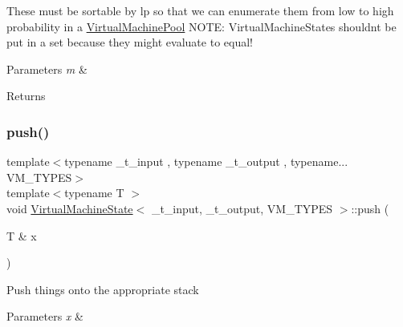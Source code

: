 These must be sortable by lp so that we can enumerate them from low to high probability in a \hyperlink{class_virtual_machine_pool}{Virtual\+Machine\+Pool} N\+O\+TE\+: Virtual\+Machine\+States shouldn\textquotesingle{}t be put in a set because they might evaluate to equal! 


\begin{DoxyParams}{Parameters}
{\em m} & \\
\hline
\end{DoxyParams}
\begin{DoxyReturn}{Returns}

\end{DoxyReturn}
\mbox{\label{class_virtual_machine_state_a7284f92013c7258d2d18ba238441c1a6}} 
\subsubsection{\texorpdfstring{push()}{push()}\hspace{0.1cm}{\footnotesize\ttfamily [1/2]}}
{\footnotesize\ttfamily template$<$typename \+\_\+t\+\_\+input , typename \+\_\+t\+\_\+output , typename... V\+M\+\_\+\+T\+Y\+P\+ES$>$ \\
template$<$typename T $>$ \\
void \hyperlink{class_virtual_machine_state}{Virtual\+Machine\+State}$<$ \+\_\+t\+\_\+input, \+\_\+t\+\_\+output, V\+M\+\_\+\+T\+Y\+P\+ES $>$\+::push (\begin{DoxyParamCaption}\item[{T \&}]{x }\end{DoxyParamCaption})\hspace{0.3cm}{\ttfamily [inline]}}

Push things onto the appropriate stack 
\begin{DoxyParams}{Parameters}
{\em x} & \\
\hline
\end{DoxyParams}
\mbox{\label{class_virtual_machine_state_a1f7aab5a5bb3b9cc4d79b50f6191ed36}} 
